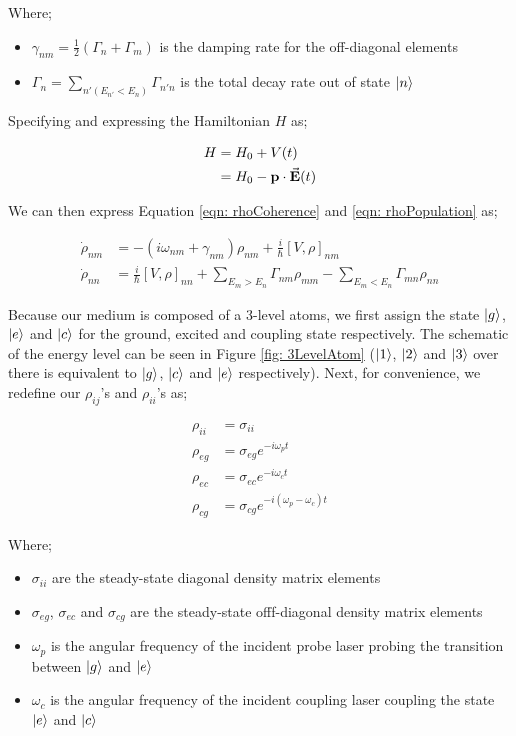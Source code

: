 Where;

\begin{itemize}
    \item $\gamma_{nm} = \frac{1}{2} (\Gamma_{n} + \Gamma_{m})$ is the damping rate for the off-diagonal elements
    \item $\Gamma_{n} = \sum_{n'(E_{n'} < E_{n})} \Gamma_{n'n}$ is the total decay rate out of state $\ket{n}$
\end{itemize}

Specifying and expressing the Hamiltonian $H$ as;

\begin{align}
    H &= H_{0} + V(t)\\
            &= H_{0} - \vb{p} \cdot \va{E}(t)
\end{align}

We can then express Equation \ref{eqn: rhoCoherence} and \ref{eqn: rhoPopulation} as;

\begin{align}
    \Dot{\rho}_{nm} &= -(i\omega_{nm} + \gamma_{nm}) \rho_{nm} + \frac{i}{\hbar} [V, \rho]_{nm} \label{eqn: rhoCohNew}\\
    \Dot{\rho}_{nn} &= \frac{i}{\hbar} [V, \rho]_{nn} + \sum_{E_{m} > E_{n}} \Gamma_{nm}\rho_{mm} - \sum_{E_{m} < E_{n}} \Gamma_{mn} \rho_{nn} \label{eqn: rhoPopNew}
\end{align}

Because our medium is composed of a 3-level atoms, we first assign the state $\ket{g}$, $\ket{e}$ and $\ket{c}$ for the ground, excited and coupling state respectively. The schematic of the energy level can be seen in Figure \ref{fig: 3LevelAtom} \cite{jeong2010slow} ($\ket{1}$, $\ket{2}$ and $\ket{3}$ over there is equivalent to $\ket{g}$, $\ket{c}$ and $\ket{e}$ respectively). Next, for convenience, we redefine our $\rho_{ij}$'s and $\rho_{ii}$'s as;

\begin{align}
    \rho_{ii} &= \sigma_{ii} \label{eqn: rhoFirst}\\
    \rho_{eg} &= \sigma_{eg} e^{-i \omega_{p} t}\\
    \rho_{ec} &= \sigma_{ec} e^{-i \omega_{c} t}\\
    \rho_{cg} &= \sigma_{cg} e^{-i (\omega_{p} - \omega_{c}) t} \label{eqn: rhoLast}
\end{align}

Where;

\begin{itemize}
    \item $\sigma_{ii}$ are the steady-state diagonal density matrix elements
    \item $\sigma_{eg}$, $\sigma_{ec}$ and $\sigma_{cg}$ are the steady-state offf-diagonal density matrix elements
    \item $\omega_{p}$ is the angular frequency of the incident probe laser probing the transition between $\ket{g}$ and $\ket{e}$
    \item $\omega_{c}$ is the angular frequency of the incident coupling laser coupling the state $\ket{e}$ and $\ket{c}$
\end{itemize}


